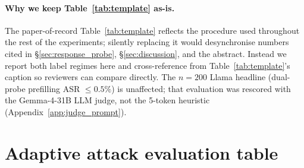 \documentclass{article}
\begin{document}
\paragraph{Why we keep Table~\ref{tab:template} as-is.} The paper-of-record Table~\ref{tab:template} reflects the procedure used throughout the rest of the experiments; silently replacing it would desynchronise numbers cited in \S\ref{sec:response_probe}, \S\ref{sec:discussion}, and the abstract. Instead we report both label regimes here and cross-reference from Table~\ref{tab:template}'s caption so reviewers can compare directly. The $n=200$ Llama headline (dual-probe prefilling ASR $\leq 0.5\%$) is unaffected; that evaluation was rescored with the Gemma-4-31B LLM judge, not the 5-token heuristic (Appendix~\ref{app:judge_prompt}).

\section{Adaptive attack evaluation table}
\label{app:adaptive_table}

\begin{table}[H]
\caption{Adaptive attack evaluation under the response probe. Each cell reports \emph{probe fire rate / observed ASR with the response probe applied}. Source: \texttt{results\_pod3\_final/adaptive\_attack/\{model\}/adaptive\_results.json}; prefill-past-window column from \texttt{results/p3\_prefill\_past\_window/\{model\}/summary.json}. The script always applies the probe (see \texttt{scripts/gpu\_adaptive\_attack.py}, \texttt{scripts/p3\_prefill\_past\_window.py}); no-defense baselines for Llama on adaptive variants were not produced by this run, so we report only matched-condition (with-probe) numbers. Mistral's probe rarely fires on these prompts, so its with-probe ASR is effectively a no-defense reading on this distribution. \textbf{Llama's prefill-past-window cell:} matched-condition benign FPR is also 100\%; the probe fires on the preamble register rather than on past-window content, consistent with \S\ref{sec:response_probe}'s surface-feature reading documentation for Llama's layer-1 probe. Referenced from \S\ref{sec:response_probe} (``Robustness to adaptive adversaries'').}
\label{tab:adaptive}
\centering
\small
{}
\end{table}
\end{document}
